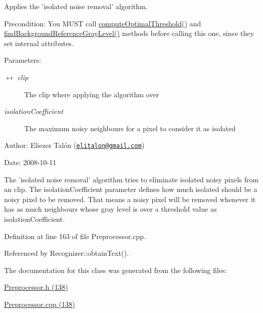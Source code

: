 Applies the 'isolated noise removal' algorithm. 

\begin{Desc}
\item[Precondition:]You MUST call \hyperlink{class_preprocessor_0e146cafa6b8b31f4f4ed189a970db7a}{computeOptimalThreshold()} and \hyperlink{class_preprocessor_19aa90451cf6f99854833c05d3e71270}{findBackgroundReferenceGrayLevel()} methods before calling this one, since they set internal attributes.\end{Desc}
\begin{Desc}
\item[Parameters:]
\begin{description}
\item[\mbox{$\leftrightarrow$} {\em clip}]The clip where applying the algorithm over \item[{\em isolationCoefficient}]The maximum noisy neighbours for a pixel to consider it as isolated\end{description}
\end{Desc}
\begin{Desc}
\item[Author:]Eliezer Talón (\href{mailto:elitalon@gmail.com}{\tt elitalon@gmail.com}) \end{Desc}
\begin{Desc}
\item[Date:]2008-10-11\end{Desc}
The 'isolated noise removal' algorithm tries to eliminate isolated noisy pixels from an clip. The isolationCoefficient parameter defines how much isolated should be a noisy pixel to be removed. That means a noisy pixel will be removed whenever it has as much neighbours whose gray level is over a threshold value as isolationCoefficient. 

Definition at line 163 of file Preprocessor.cpp.

Referenced by Recognizer::obtainText().

The documentation for this class was generated from the following files:\begin{CompactItemize}
\item 
\hyperlink{_preprocessor_8h}{Preprocessor.h (138)}\item 
\hyperlink{_preprocessor_8cpp}{Preprocessor.cpp (138)}\end{CompactItemize}
